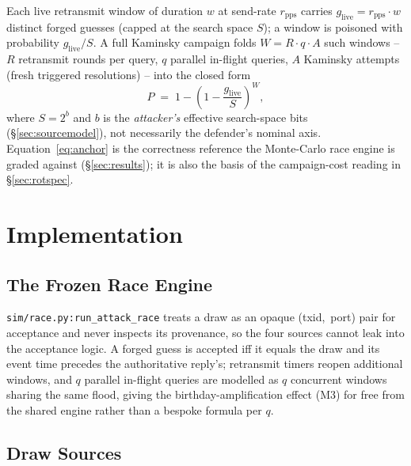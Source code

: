 \documentclass[conference]{IEEEtran}
\begin{document}
Each live retransmit window of duration $w$ at send-rate $r_{\mathrm{pps}}$ carries $g_{\mathrm{live}} =
r_{\mathrm{pps}} \cdot w$ distinct forged guesses (capped at the search space $S$); a window is poisoned
with probability $g_{\mathrm{live}}/S$. A full Kaminsky campaign folds $W = R \cdot q \cdot A$ such
windows -- $R$ retransmit rounds per query, $q$ parallel in-flight queries, $A$ Kaminsky attempts (fresh
triggered resolutions) -- into the closed form
\begin{equation}
P \;=\; 1 - \left(1 - \frac{g_{\mathrm{live}}}{S}\right)^{W}\!,
\label{eq:anchor}
\end{equation}
where $S = 2^{b}$ and $b$ is the \emph{attacker's} effective search-space bits (\S\ref{sec:sourcemodel}),
not necessarily the defender's nominal axis. Equation~\ref{eq:anchor} is the correctness reference the
Monte-Carlo race engine is graded against (\S\ref{sec:results}); it is also the basis of the campaign-cost
reading in \S\ref{sec:rotspec}.

\section{Implementation}

\subsection{The Frozen Race Engine}

\texttt{sim/race.py:run\_attack\_race} treats a draw as an opaque \mbox{(txid, port)} pair for acceptance
and never inspects its provenance, so the four sources cannot leak into the acceptance logic. A forged
guess is accepted iff it equals the draw and its event time precedes the authoritative reply's; retransmit
timers reopen additional windows, and $q$ parallel in-flight queries are modelled as $q$ concurrent
windows sharing the same flood, giving the birthday-amplification effect (M3) for free from the shared
engine rather than a bespoke formula per $q$.

\subsection{Draw Sources}
\end{document}
